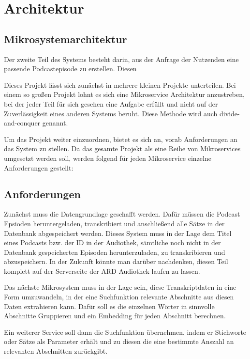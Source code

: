 \chapter{Architektur}\label{ch:method}


\section{Mikrosystemarchitektur}

Der zweite Teil des Systems besteht darin, aus der Anfrage der Nutzenden eine passende Podcastepisode zu erstellen.
Diesen 

Dieses Projekt lässt sich zunächst in mehrere kleinen Projekte unterteilen. 
Bei einem so großen Projekt lohnt es sich eine Mikroservice Architektur anzustreben, bei der jeder Teil für sich gesehen eine Aufgabe erfüllt und nicht auf der Zuverlässigkeit eines anderen Systems beruht. 
Diese Methode wird auch divide-and-conquer genannt. 

Um das Projekt weiter einzuordnen, bietet es sich an, vorab Anforderungen an das System zu stellen. 
Da das gesamte Projekt als eine Reihe von Mikroservices umgesetzt werden soll, werden folgend für jeden Mikroservice einzelne Anforderungen gestellt: 

\section{Anforderungen}

Zunächst muss die Datengrundlage geschafft werden. 
Dafür müssen die Podcast Epsioden heruntergeladen, transkribiert und anschließend alle Sätze in der Datenbank abgespeichert werden.
Dieses System muss in der Lage dem Titel eines Podcasts bzw. der ID in der Audiothek, sämtliche noch nicht in der Datenbank gespeicherten Episoden herunterzuladen, zu transkribieren und abzuspeichern.
In der Zukunft könnte man darüber nachdenken, diesen Teil komplett auf der Serverseite der ARD Audiothek laufen zu lassen.

Das nächste Mikrosystem muss in der Lage sein, diese Transkriptdaten in eine Form umzuwandeln, in der eine Suchfunktion relevante Abschnitte aus diesen Daten extrahieren kann.
Dafür soll es die einzelnen Wörter in sinnvolle Abschnitte Gruppieren und ein Embedding für jeden Abschnitt berechnen.

Ein weiterer Service soll dann die Suchfunktion übernehmen, indem er Stichworte oder Sätze als Parameter erhält und zu diesen die eine bestimmte Anszahl an relevanten Abschnitten zurückgibt.

